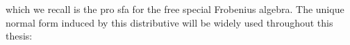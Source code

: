 %
%
%
%
which we recall is the  pro {\sf sfa} for the free  special  Frobenius algebra.
The unique normal form induced by this distributive will be widely used throughout this thesis:
